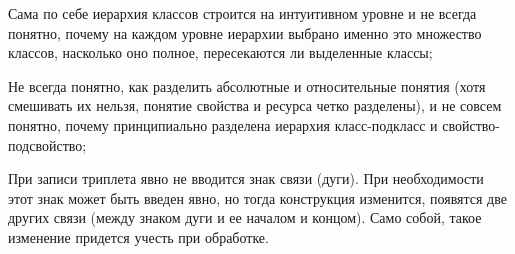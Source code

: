 {\begin{scnitemize}
\begin{scnitemizeii}
			\item Сама по себе иерархия классов строится на интуитивном уровне и не всегда понятно, почему на каждом уровне иерархии выбрано именно это множество классов, насколько оно полное, пересекаются ли выделенные классы;
			\item Не всегда понятно, как разделить абсолютные и относительные понятия (хотя смешивать их нельзя, понятие свойства и ресурса четко разделены), и не совсем понятно, почему принципиально разделена иерархия класс-подкласс и свойство-подсвойство;
		\end{scnitemizeii}
		\item При записи триплета явно не вводится знак связи (дуги). При необходимости этот знак может быть введен явно, но тогда конструкция изменится, появятся две других связи (между знаком дуги и ее началом и концом). Само собой, такое изменение придется учесть при обработке.
	\end{scnitemize}
}